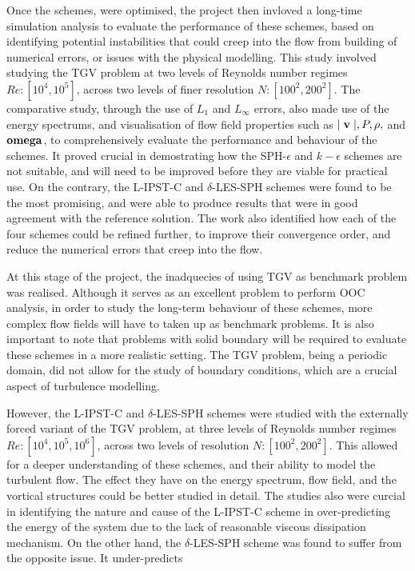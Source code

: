 Once the schemes, were optimised, the project then invloved a long-time simulation analysis to evaluate the performance of these schemes, based on identifying potential instabilities that could creep into the flow from building of numerical errors, or issues with the physical modelling. This study involved studying the TGV problem at two levels of Reynolds number regimes $Re: [10^4, 10^5]$, across two levels of finer resolution $N: [100^2, 200^2]$.
The comparative study, through the use of $L_1$ and $L_{\infty}$ errors, also made use of the energy spectrums, and visualisation of flow field properties such as $\mid \mathbf{v} \mid, P, \rho,$ and  $\mathbf{omega}$, to comprehensively evaluate the performance and behaviour of the schemes.
It proved crucial in demostrating how the SPH-$\epsilon$ and $k-\epsilon$ schemes are not suitable, and will need to be improved before they are viable for practical use. 
On the contrary, the L-IPST-C and $\delta$-LES-SPH schemes were found to be the most promising, and were able to produce results that were in good agreement with the reference solution.
The work also identified how each of the four schemes could be refined further, to improve their convergence order, and reduce the numerical errors that creep into the flow.

At this stage of the project, the inadquecies of using TGV as benchmark problem was realised. Although it serves as an excellent problem to perform OOC analysis, in order to study the long-term behaviour of these schemes, more complex flow fields will have to taken up as benchmark problems. It is also important to note that problems with solid boundary will be required to evaluate these schemes in a more realistic setting. The TGV problem, being a periodic domain, did not allow for the study of boundary conditions, which are a crucial aspect of turbulence modelling.

However, the L-IPST-C and $\delta$-LES-SPH schemes were studied with the externally forced variant of the TGV problem, at three levels of Reynolds number regimes $Re: [10^4, 10^5, 10^6]$, across two levels of resolution $N: [100^2, 200^2]$.
This allowed for a deeper understanding of these schemes, and their ability to model the turbulent flow. The effect they have on the energy spectrum, flow field, and the vortical structures could be better studied in detail.
The studies also were curcial in identifying the nature and cause of the L-IPST-C scheme in over-predicting the energy of the system due to the lack of reasonable viscous dissipation mechanism. On the other hand, the $\delta$-LES-SPH scheme was found to suffer from the opposite issue. It under-predicts 

